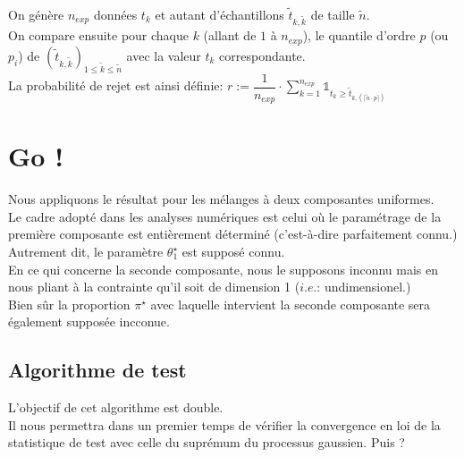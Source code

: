 \documentclass{article}
\title{}
\author{Cyril THOMMERET \\ LPSM - Sorbonne Université \\ SAFRAN Aircraft Engines}
\date{\today}
\begin{document}
\maketitle
\tableofcontents
\newpage

     \\

    On génère $n_{exp}$ données $t_k$ et autant d'échantillons $\tilde{t}_{k,\tilde{k}}$ de taille $\tilde{n}$. \\

    On compare ensuite pour chaque $k$ (allant de $1$ à $n_{exp}$), le quantile d'ordre $p$ (ou $p_i$) de $(\tilde{t}_{k,\tilde{k}})_{1\leq \tilde{k}\leq \tilde{n}}$ avec la valeur $t_k$ correspondante. \\

    La probabilité de rejet est ainsi définie: $r:=\dfrac{1}{n_{exp}}\cdot\sum_{k=1}^{n_{exp}}\mathbb{1}_{t_k\geq \tilde{t}_{k,(\lceil \tilde{n}\cdot p \rceil)}}$


    \section{Go !}

        Nous appliquons le résultat pour les mélanges à deux composantes uniformes. \\

        Le cadre adopté dans les analyses numériques est celui où le paramétrage de la première composante est entièrement déterminé (c'est-à-dire parfaitement connu.) Autrement dit, le paramètre $\theta_1^\star$ est supposé connu. \\

        En ce qui concerne la seconde composante, nous le supposons inconnu mais en nous pliant à la contrainte qu'il soit de dimension 1 ($i.e.$: undimensionel.) \\

        Bien sûr la proportion $\pi^\star$ avec laquelle intervient la seconde composante sera également supposée incconue. 

        \subsection{Algorithme de test}

            L'objectif de cet algorithme est double. \\

            Il nous permettra dans un premier temps de vérifier la convergence en loi de la statistique de test avec celle du suprémum du processus gaussien. {\color{green} Puis ?}\\
\end{document}
